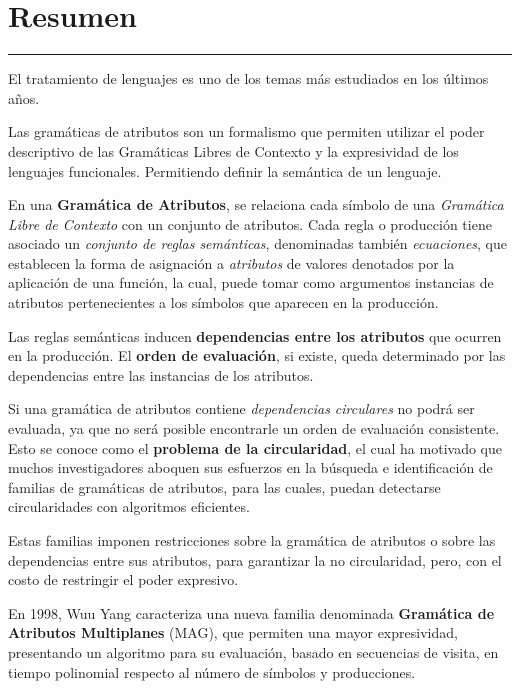 \documentclass[a4paper,11pt]{ThesisStyle}
\begin{document}
\dominitoc
{}


\cleardoublepage

\chapter*{Resumen}
\noindent\rule[2pt]{\textwidth}{0.5pt}

El tratamiento de lenguajes es uno de los temas más estudiados en los últimos años.

Las gramáticas de atributos son un formalismo que permiten utilizar el poder descriptivo de las Gramáticas Libres de Contexto y la expresividad de los lenguajes funcionales. Permitiendo definir la semántica de un lenguaje.

En una \textbf{Gramática de Atributos}, se relaciona cada símbolo de una \textit{Gramática Libre de Contexto} con un conjunto de atributos. Cada regla o producción tiene asociado un \textit{conjunto de reglas semánticas}, denominadas también \textit{ecuaciones}, que establecen la forma de asignación a \textit{atributos} de valores denotados por la aplicación de una función, la cual, puede tomar como argumentos instancias de atributos pertenecientes a los símbolos que aparecen en la producción.

Las reglas semánticas inducen \textbf{dependencias entre los atributos} que ocurren en la producción. El \textbf{orden de evaluación}, si existe, queda determinado por las dependencias entre las instancias de los atributos.

Si una gramática de atributos contiene \textit{dependencias circulares} no podrá ser evaluada, ya que no será posible encontrarle un orden de evaluación consistente. Esto se conoce como el \textbf{problema de la circularidad}, el cual ha motivado que muchos investigadores aboquen sus esfuerzos en la búsqueda e identificación de familias de gramáticas de atributos, para las cuales, puedan detectarse circularidades con algoritmos eficientes.

Estas familias imponen restricciones sobre la gramática de atributos o sobre las dependencias entre sus atributos, para garantizar la no circularidad, pero, con el costo de restringir el poder expresivo.

En 1998, Wuu Yang caracteriza una nueva familia denominada \textbf{Gramática de Atributos Multiplanes} (MAG), que permiten una mayor expresividad, presentando un algoritmo para su evaluación, basado en secuencias de visita, en tiempo polinomial respecto al número de símbolos y producciones.
\end{document}
